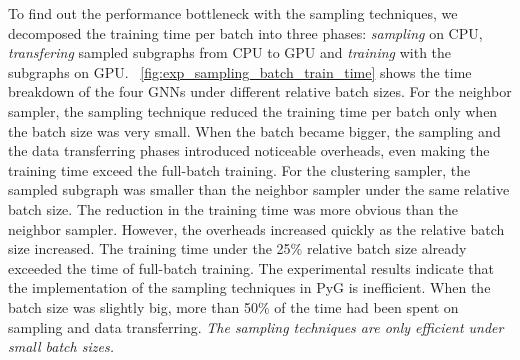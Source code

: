 To find out the performance bottleneck with the sampling techniques, we decomposed the training time per batch into three phases: \emph{sampling} on CPU, \emph{transfering} sampled subgraphs from CPU to GPU and \emph{training} with the subgraphs on GPU.
\figurename~\ref{fig:exp_sampling_batch_train_time} shows the time breakdown of the four GNNs under different relative batch sizes.
For the neighbor sampler, the sampling technique reduced the training time per batch only when the batch size was very small.
When the batch became bigger, the sampling and the data transferring phases introduced noticeable overheads, even making the training time exceed the full-batch training.
For the clustering sampler, the sampled subgraph was smaller than the neighbor sampler under the same relative batch size.
The reduction in the training time was more obvious than the neighbor sampler.
However, the overheads increased quickly as the relative batch size increased.
The training time under the 25\% relative batch size already exceeded the time of full-batch training.
The experimental results indicate that the implementation of the sampling techniques in PyG is inefficient.
When the batch size was slightly big, more than 50\% of the time had been spent on sampling and data transferring.
\emph{The sampling techniques are only efficient under small batch sizes.}

